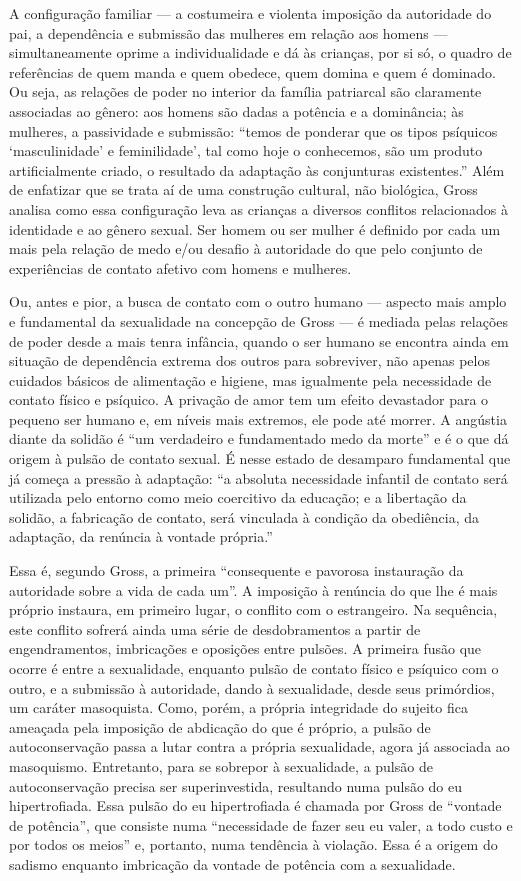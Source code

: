 A configuração familiar --- a costumeira e violenta imposição da
autoridade do pai, a dependência e submissão das mulheres em relação aos
homens --- simultaneamente oprime a individualidade e dá às crianças, por
si só, o quadro de referências de quem manda e quem obedece, quem domina
e quem é dominado. Ou seja, as relações de poder no interior da família
patriarcal são claramente associadas ao gênero: aos homens são dadas a
potência e a dominância; às mulheres, a passividade e submissão: ``temos
de ponderar que os tipos psíquicos `masculinidade' e feminilidade', tal
como hoje o conhecemos, são um produto artificialmente criado, o
resultado da adaptação às conjunturas existentes.'' Além de enfatizar
que se trata aí de uma construção cultural, não biológica, Gross analisa
como essa configuração leva as crianças a diversos conflitos
relacionados à identidade e ao gênero sexual. Ser homem ou ser mulher é
definido por cada um mais pela relação de medo e/ou desafio à autoridade
do que pelo conjunto de experiências de contato afetivo com homens e
mulheres.

Ou, antes e pior, a busca de contato com o outro humano --- aspecto mais
amplo e fundamental da sexualidade na concepção de Gross --- é mediada
pelas relações de poder desde a mais tenra infância, quando o ser humano
se encontra ainda em situação de dependência extrema dos outros para
sobreviver, não apenas pelos cuidados básicos de alimentação e higiene,
mas igualmente pela necessidade de contato físico e psíquico. A privação
de amor tem um efeito devastador para o pequeno ser humano e, em níveis
mais extremos, ele pode até morrer. A angústia diante da solidão é ``um
verdadeiro e fundamentado medo da morte'' e é o que dá origem à pulsão
de contato sexual. É nesse estado de desamparo fundamental que já começa
a pressão à adaptação: ``a absoluta necessidade infantil de contato será
utilizada pelo entorno como meio coercitivo da educação; e a libertação
da solidão, a fabricação de contato, será vinculada à condição da
obediência, da adaptação, da renúncia à vontade própria.''

Essa é, segundo Gross, a primeira ``consequente e pavorosa instauração
da autoridade sobre a vida de cada um''. A imposição à renúncia do que
lhe é mais próprio instaura, em primeiro lugar, o conflito com o
estrangeiro. Na sequência, este conflito sofrerá ainda uma série de
desdobramentos a partir de engendramentos, imbricações e oposições entre
pulsões. A primeira fusão que ocorre é entre a sexualidade, enquanto
pulsão de contato físico e psíquico com o outro, e a submissão à
autoridade, dando à sexualidade, desde seus primórdios, um caráter
masoquista. Como, porém, a própria integridade do sujeito fica ameaçada
pela imposição de abdicação do que é próprio, a pulsão de
autoconservação passa a lutar contra a própria sexualidade, agora já
associada ao masoquismo. Entretanto, para se sobrepor à sexualidade, a
pulsão de autoconservação precisa ser superinvestida, resultando numa
pulsão do eu hipertrofiada. Essa pulsão do eu hipertrofiada é chamada
por Gross de ``vontade de potência'', que consiste numa ``necessidade de
fazer seu eu valer, a todo custo e por todos os meios'' e, portanto,
numa tendência à violação. Essa é a origem do sadismo enquanto
imbricação da vontade de potência com a sexualidade.

